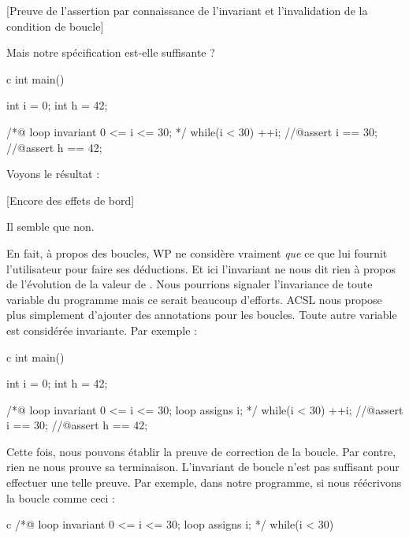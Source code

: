 \documentclass[middle]{zmdocument}
\begin{document}
[Preuve de l'assertion par connaissance de l'invariant et l'invalidation de la condition de boucle]


Mais notre spécification est-elle suffisante ?



\begin{CodeBlock}{c}
int main(){
  int i = 0;
  int h = 42;
  
  /*@
    loop invariant 0 <= i <= 30;
  */
  while(i < 30){
    ++i;
  }
  //@assert i == 30;
  //@assert h == 42;
}
\end{CodeBlock}



Voyons le résultat :



[Encore des effets de bord]


Il semble que non.





En fait, à propos des boucles, WP ne considère vraiment \textit{que} ce que lui 
fournit l'utilisateur pour faire ses déductions. Et ici l'invariant ne nous dit
rien à propos de l'évolution de la valeur de . Nous pourrions signaler 
l'invariance de toute variable du programme mais ce serait beaucoup d'efforts. 
ACSL nous propose plus simplement d'ajouter des annotations  pour 
les boucles. Toute autre variable est considérée invariante. Par exemple :



\begin{CodeBlock}{c}
int main(){
  int i = 0;
  int h = 42;
  
  /*@
    loop invariant 0 <= i <= 30;
    loop assigns i;
  */
  while(i < 30){
    ++i;
  }
  //@assert i == 30;
  //@assert h == 42;
}
\end{CodeBlock}



Cette fois, nous pouvons établir la preuve de correction de la boucle. Par contre, 
rien ne nous prouve sa terminaison. L'invariant de boucle n'est pas suffisant pour 
effectuer une telle preuve. Par exemple, dans notre programme, si nous réécrivons 
la boucle comme ceci :



\begin{CodeBlock}{c}
/*@
  loop invariant 0 <= i <= 30;
  loop assigns i;
*/
while(i < 30){
   
}
\end{CodeBlock}
\end{document}
